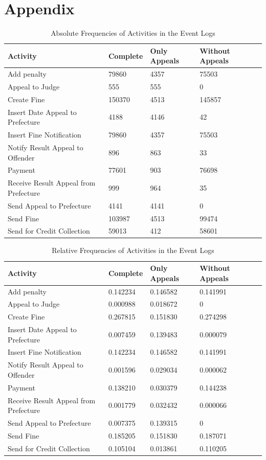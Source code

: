 \documentclass[12pt]{report}
\begin{document}
\section*{Appendix}

\begin{table}[H]
\centering
\begin{tabular}{|l|l|l|l|l|}
\hline \textbf{Activity} & \textbf{Complete} & \textbf{Only Appeals} & \textbf{Without Appeals} \\
\hline Add penalty & 79860 & 4357 & 75503\\
\hline Appeal to Judge & 555 & 555 &0\\
\hline Create Fine & 150370 & 4513 & 145857\\
\hline Insert Date Appeal to Prefecture & 4188 & 4146 & 42\\
\hline Insert Fine Notification & 79860 & 4357 & 75503\\
\hline Notify Result Appeal to Offender & 896 & 863 & 33\\
\hline Payment  & 77601 & 903 & 76698\\
\hline Receive Result Appeal from Prefecture & 999 & 964 & 35\\
\hline Send Appeal to Prefecture  & 4141 & 4141 & 0\\
\hline Send Fine  & 103987 & 4513 & 99474\\
\hline Send for Credit Collection & 59013 & 412 & 58601\\
\hline
\end{tabular}
\caption{Absolute Frequencies of Activities in the Event Logs}
\label{tab:1c_absolut}
\end{table}

\begin{table}[H]
\centering
\begin{tabular}{|l|l|l|l|l|}
\hline \textbf{Activity} & \textbf{Complete} & \textbf{Only Appeals} & \textbf{Without Appeals} \\
\hline Add penalty & 0.142234 & 0.146582 & 0.141991\\
\hline Appeal to Judge & 0.000988 & 0.018672 &0\\
\hline Create Fine & 0.267815 & 0.151830 & 0.274298\\
\hline Insert Date Appeal to Prefecture & 0.007459 & 0.139483 & 0.000079\\
\hline Insert Fine Notification & 0.142234 & 0.146582 & 0.141991\\
\hline Notify Result Appeal to Offender & 0.001596 & 0.029034 & 0.000062\\
\hline Payment  & 0.138210 & 0.030379 & 0.144238\\
\hline Receive Result Appeal from Prefecture & 0.001779 & 0.032432 & 0.000066\\
\hline Send Appeal to Prefecture  & 0.007375 & 0.139315 & 0\\
\hline Send Fine  & 0.185205 & 0.151830 & 0.187071\\
\hline Send for Credit Collection & 0.105104 & 0.013861 & 0.110205\\
\hline
\end{tabular}
\caption{Relative Frequencies of Activities in the Event Logs}
\label{tab:1c_relative}
\end{table}
\end{document}
